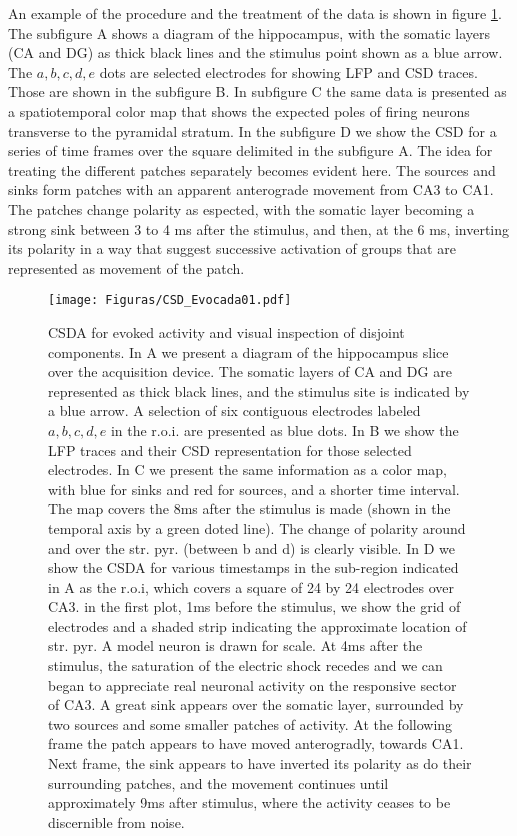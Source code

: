 \documentclass[12pt]{article}
\begin{document}
An example of the procedure and the treatment of the data is shown in figure
\ref{CSD_Evocada01}.  The subfigure A  shows a diagram of the hippocampus, with
the somatic layers (CA and DG) as thick black lines and the stimulus point
shown as a blue arrow. The $a,b,c,d,e$ dots are selected electrodes for
showing LFP and CSD traces. Those are shown in the subfigure B. In subfigure
C the same data is presented as a spatiotemporal color map that
shows the expected poles of firing neurons transverse to the
pyramidal stratum.  In the subfigure D we show the CSD for a series of time frames
over the square delimited in the subfigure A. The idea for treating the different
patches separately becomes evident here. The sources and sinks form patches
with an apparent anterograde movement from CA3 to CA1. The patches change polarity
as espected, with the somatic layer becoming a strong sink between 3 to 4 ms
after the stimulus, and then, at the 6 ms, inverting its polarity in a way that suggest
successive activation of groups that are represented as movement of the patch.

\begin{figure}[h]
  \texttt{[image: Figuras/CSD\_Evocada01.pdf]}
  \caption{ CSDA for evoked activity and visual inspection of disjoint
    components. In A we present a diagram of the hippocampus slice over
    the acquisition device. The somatic layers of CA and DG are represented as
    thick black lines, and the stimulus site is indicated by a blue arrow. A selection
    of six contiguous electrodes labeled $a,b,c,d,e$ in the r.o.i. are presented as blue
    dots. In B we show the LFP traces and their CSD representation for those
    selected electrodes. In C we present the same information as a color map,
    with blue for sinks and red for sources, and a shorter time interval. The
    map covers the 8ms after the stimulus is made (shown in the temporal axis by a
    green doted line). The change of polarity around and over the
    str. pyr. (between b and
    d) is clearly visible. In D we show the CSDA for various timestamps in the sub-region
    indicated in A as the r.o.i, which covers a square of 24 by 24 electrodes over CA3.
    in the first plot, 1ms before the stimulus, we show the grid of electrodes and a
    shaded strip indicating the approximate location of str. pyr. A model neuron is
    drawn for scale. At 4ms after the stimulus, the saturation of the electric shock
    recedes and we can began to appreciate real neuronal activity on the responsive
    sector of CA3. A great sink appears over the somatic layer, surrounded by two
    sources and some smaller patches of activity. At the following frame the patch
    appears to have moved anterogradly, towards CA1. Next frame, the sink appears
    to have inverted its polarity as do their surrounding patches, and the movement
    continues until approximately 9ms after stimulus, where the activity ceases to be
    discernible from noise.}
  \label{CSD_Evocada01}
\end{figure}
\end{document}

